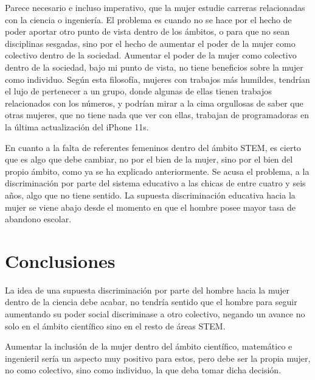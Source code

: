 Parece necesario e incluso imperativo, que la mujer estudie carreras relacionadas con la ciencia o ingeniería. El problema es 
cuando no se hace por el hecho de poder aportar otro punto de vista dentro de los ámbitos, o para que no sean disciplinas 
sesgadas, sino por el hecho de aumentar el poder de la mujer como colectivo dentro de la sociedad. Aumentar el poder de 
la mujer como colectivo dentro de la sociedad, bajo mi punto de vista, no tiene beneficios sobre la mujer como individuo. 
Según esta filosofía, mujeres con trabajos más humildes, tendrían el lujo de pertenecer a un grupo, donde algunas de 
ellas tienen trabajos relacionados con los números, y podrían mirar a la cima orgullosas de saber que otras mujeres, que
 no tiene nada que ver con ellas, trabajan de programadoras en la última actualización del iPhone 11s.

En cuanto a la falta de referentes femeninos dentro del ámbito STEM, es cierto que es algo que debe cambiar, no por el bien 
de la mujer, sino por el bien del propio ámbito, como ya se ha explicado anteriormente. Se acusa el problema, a la discriminación 
por parte del sistema educativo a las chicas de entre cuatro y seis años, algo que no tiene sentido. La supuesta discriminación 
educativa hacia la mujer se viene abajo desde el momento en que el hombre posee mayor tasa de abandono escolar.


\section{Conclusiones}
\label{sec:conclusiones}

La idea de una supuesta discriminación por parte del hombre hacia la mujer dentro de la ciencia debe acabar, no tendría 
sentido que el hombre para seguir aumentando su poder social discriminase a otro colectivo, negando un avance no solo 
en el ámbito científico sino en el resto de áreas STEM. 

Aumentar la inclusión de la mujer dentro del ámbito científico, matemático e ingenieril sería un aspecto muy positivo para 
estos, pero debe ser la propia mujer, no como colectivo, sino como individuo, la que deba tomar dicha decisión.\nocite{maldita}

          


